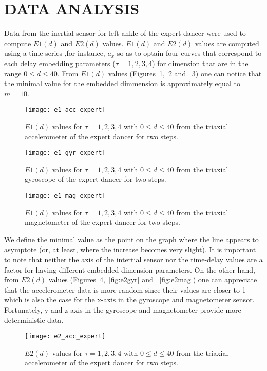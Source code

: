 \documentclass{sigchi}
\begin{document}
\section{DATA ANALYSIS}
Data from the inertial sensor for left ankle of the expert dancer were used to compute $E1(d)$ and $E2(d)$ values. 
$E1(d)$ and $E2(d)$ values are computed using a time-series ,for instance, $a_x$
so as to optain four curves that correspond to each delay embedding parameters ($\tau=1,2,3,4$)
for dimension that are in the range $0 \leq d \leq 40$.
From $E1(d)$ values 
(Figures~\ref{fig:e1acc},~\ref{fig:e1gyr} and ~\ref{fig:e1mag})
one can notice that the minimal value for the embedded dimmension is approximately
equal to $m=10$. 
  \begin{figure}[htbp!] 
  \centering    
  \texttt{[image: e1\_acc\_expert]}
  \caption[PA]{$E1(d)$ values for $\tau=1,2,3,4$ with $0 \leq d \leq 40$
  from the triaxial accelerometer of the expert dancer for two steps.}
  \label{fig:e1acc}
  \end{figure}
    \begin{figure}[htbp!] 
  \centering    
  \texttt{[image: e1\_gyr\_expert]}
  \caption[PA]{$E1(d)$ values for $\tau=1,2,3,4$ with $0 \leq d \leq 40$
  from the triaxial gyroscope of the expert dancer for two steps.}
  \label{fig:e1gyr}
  \end{figure}
      \begin{figure}[htbp!] 
  \centering    
  \texttt{[image: e1\_mag\_expert]}
  \caption[PA]{$E1(d)$ values for $\tau=1,2,3,4$ with $0 \leq d \leq 40$
  from the triaxial magnetometer of the expert dancer for two steps.}
  \label{fig:e1mag}
  \end{figure}
We define the minimal value as the point on the graph where the 
line appears to asymptote (or, at least, where the increase becomes very slight). 
It is important to note that neither the axis of the intertial sensor 
nor the time-delay values are a factor for having different embedded dimension parameters.
On the other hand, from $E2(d)$ values (Figures~\ref{fig:e2acc},~\ref{fig:e2gyr} and ~\ref{fig:e2mag})
one can appreciate that the accelerometer data is more random since their values are closer to 1
which is also the case for the x-axis in the gyroscope and magnetometer sensor. 
Fortunately, y and z axis in the gyroscope and magnetometer provide more deterministic data.
    \begin{figure}[htbp!] 
  \centering    
  \texttt{[image: e2\_acc\_expert]}
  \caption[PA]{$E2(d)$ values for $\tau=1,2,3,4$ with $0 \leq d \leq40 $
  from the triaxial accelerometer of the expert dancer for two steps.
  }
  \label{fig:e2acc}
  \end{figure}
\end{document}
